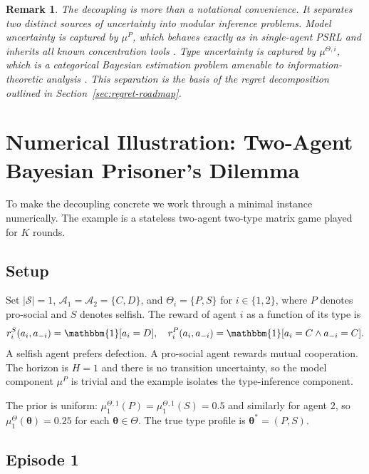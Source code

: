 \documentclass{article}
\newtheorem{remark}[theorem]{Remark}
\begin{document}
\begin{remark}
The decoupling is more than a notational convenience. It separates two distinct sources of uncertainty into modular inference problems. Model uncertainty is captured by $\mu^P$, which behaves exactly as in single-agent PSRL and inherits all known concentration tools \citep{agrawal2017optimistic}. Type uncertainty is captured by $\mu^{\Theta,i}$, which is a categorical Bayesian estimation problem amenable to information-theoretic analysis \citep{russo2014learning}. This separation is the basis of the regret decomposition outlined in Section~\ref{sec:regret-roadmap}.
\end{remark}

\section{Numerical Illustration: Two-Agent Bayesian Prisoner's Dilemma}
\label{sec:example}

To make the decoupling concrete we work through a minimal instance numerically. The example is a stateless two-agent two-type matrix game played for $K$ rounds.

\subsection{Setup}

Set $|\mathcal{S}| = 1$, $\mathcal{A}_1 = \mathcal{A}_2 = \{C, D\}$, and $\Theta_i = \{P, S\}$ for $i \in \{1, 2\}$, where $P$ denotes pro-social and $S$ denotes selfish. The reward of agent $i$ as a function of its type is
\begin{equation}
r_i^S(a_i, a_{-i}) = \mathbbm{1}[a_i = D], \quad r_i^P(a_i, a_{-i}) = \mathbbm{1}[a_i = C \wedge a_{-i} = C].
\end{equation}
A selfish agent prefers defection. A pro-social agent rewards mutual cooperation. The horizon is $H = 1$ and there is no transition uncertainty, so the model component $\mu^P$ is trivial and the example isolates the type-inference component.

The prior is uniform: $\mu_1^{\Theta,1}(P) = \mu_1^{\Theta,1}(S) = 0.5$ and similarly for agent $2$, so $\mu_1^\Theta(\boldsymbol{\theta}) = 0.25$ for each $\boldsymbol{\theta} \in \Theta$. The true type profile is $\boldsymbol{\theta}^* = (P, S)$.

\subsection{Episode 1}
\end{document}
